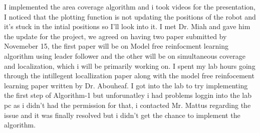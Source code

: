\documentclass[fontsize=11pt, %
                             paper=letter, %
                             twoside, %
                             captions=tableheading,
                             index=totoc,
                             hyperref]{labbook}
\begin{document}
I implemented the area coverage algorithm and i took videos for the presentation, I noticed that the plotting function is not updating the positions of the robot and it's stuck in the intial positions so I'll look into it. 
I met Dr. Miah and gave him the update for the project, we agreed on having two paper submitted by Novemeber 15, the first paper will be on Model free reinfocment learning algorithm using leader follower and the other will be on simultaneous coverage and localization, which i will be primarily  working on. 
I spent my lab hours going through the intillegent locallization paper along with the model free reinfocement learning paper written by Dr. Abouheaf.
I got into the lab to try implementing the first step of Algorithm-1 but unforunatley i had problems loggin into the lab pc as i didn't had the permission for that, i contacted Mr. Mattus regarding the issue and it was finally resolved but i didn't get the chance to implement the algorithm. 









\end{document}
